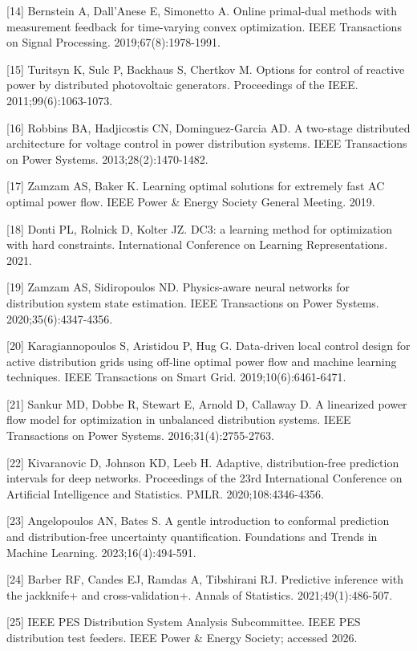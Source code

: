 \documentclass[
  preprint,12pt]{elsarticle}
\begin{document}
{[}14{]} Bernstein A, Dall'Anese E, Simonetto A. Online primal-dual
methods with measurement feedback for time-varying convex optimization.
IEEE Transactions on Signal Processing. 2019;67(8):1978-1991.

{[}15{]} Turitsyn K, Sulc P, Backhaus S, Chertkov M. Options for control
of reactive power by distributed photovoltaic generators. Proceedings of
the IEEE. 2011;99(6):1063-1073.

{[}16{]} Robbins BA, Hadjicostis CN, Dominguez-Garcia AD. A two-stage
distributed architecture for voltage control in power distribution
systems. IEEE Transactions on Power Systems. 2013;28(2):1470-1482.

{[}17{]} Zamzam AS, Baker K. Learning optimal solutions for extremely
fast AC optimal power flow. IEEE Power \& Energy Society General
Meeting. 2019.

{[}18{]} Donti PL, Rolnick D, Kolter JZ. DC3: a learning method for
optimization with hard constraints. International Conference on Learning
Representations. 2021.

{[}19{]} Zamzam AS, Sidiropoulos ND. Physics-aware neural networks for
distribution system state estimation. IEEE Transactions on Power
Systems. 2020;35(6):4347-4356.

{[}20{]} Karagiannopoulos S, Aristidou P, Hug G. Data-driven local
control design for active distribution grids using off-line optimal
power flow and machine learning techniques. IEEE Transactions on Smart
Grid. 2019;10(6):6461-6471.

{[}21{]} Sankur MD, Dobbe R, Stewart E, Arnold D, Callaway D. A
linearized power flow model for optimization in unbalanced distribution
systems. IEEE Transactions on Power Systems. 2016;31(4):2755-2763.

{[}22{]} Kivaranovic D, Johnson KD, Leeb H. Adaptive, distribution-free
prediction intervals for deep networks. Proceedings of the 23rd
International Conference on Artificial Intelligence and Statistics.
PMLR. 2020;108:4346-4356.

{[}23{]} Angelopoulos AN, Bates S. A gentle introduction to conformal
prediction and distribution-free uncertainty quantification. Foundations
and Trends in Machine Learning. 2023;16(4):494-591.

{[}24{]} Barber RF, Candes EJ, Ramdas A, Tibshirani RJ. Predictive
inference with the jackknife+ and cross-validation+. Annals of
Statistics. 2021;49(1):486-507.

{[}25{]} IEEE PES Distribution System Analysis Subcommittee. IEEE PES
distribution test feeders. IEEE Power \& Energy Society; accessed 2026.
\end{document}
